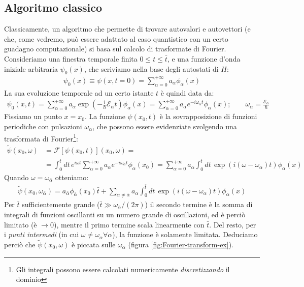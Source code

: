 \documentclass[../../InformazioneQuantistica.tex]{subfiles}
\begin{document}
\subsection{Algoritmo classico}
Classicamente, un algoritmo che permette di trovare autovalori e autovettori (e che, come vedremo, può essere adattato al caso quantistico con un certo guadagno computazionale) si basa sul calcolo di trasformate di Fourier.\\
Consideriamo una finestra temporale finita $0\leq t \leq \bar{t}$, e una funzione d'onda iniziale arbitraria $\psi_0(x)$, che scriviamo nella base degli autostati di $H$:
\begin{align*}
    \psi_0(x) \equiv \psi(x,t=0) = \sum_{\alpha=0}^{+\infty} a_\alpha \phi_\alpha(x)
\end{align*}
La sua evoluzione temporale ad un certo istante $t$ è quindi data da:
\begin{align*}
    \psi_0(x,t) = \sum_{\alpha=0}^{+\infty} a_\alpha \exp\left( - \frac{i}{\hbar} \mathcal{E}_\alpha t \right) \phi_\alpha(x) = \sum_{\alpha=0}^{+\infty} a_\alpha e^{-i\omega_\alpha t} \phi_\alpha(x); \qquad \omega_\alpha = \frac{\mathcal{E}_\alpha}{\hbar}
\end{align*}
Fissiamo un punto $x=x_0$. La funzione $\psi(x_0,t)$ è la sovrapposizione di funzioni periodiche con pulsazioni $\omega_\alpha$, che possono essere evidenziate svolgendo una trasformata di Fourier\footnote{Gli integrali possono essere calcolati numericamente \textit{discretizzando} il dominio}:
\begin{align*}
    \tilde{\psi}(x_0, \omega) &= \mathcal{F}[\psi(x_0,t)](x_0, \omega) =\\
    &= \int_0^{\bar{t}} dt\, e^{i\omega t} \sum_{\alpha=0}^{+\infty} a_\alpha e^{-i\omega_\alpha t}\phi_\alpha(x_0) = 
    \sum_{\alpha=0}^{+\infty} a_\alpha \int_0^{\bar{t}} dt\, \exp(i(\omega-\omega_\alpha)t) \phi_\alpha(x)
\end{align*}
Quando $\omega = \omega_{\bar{\alpha}}$ otteniamo:
\begin{align*}
    \tilde{\psi}(x_0, \omega_{\bar{\alpha}}) = a_{\bar{\alpha}} \phi_{\bar{\alpha}}(x_0) \bar{t} + \sum_{\alpha \neq \bar{\alpha}} a_\alpha \int_0^{\bar{t}} dt\, \exp(i(\omega-\omega_\alpha)t)\phi_\alpha(x)
\end{align*}
Per $\bar{t}$ sufficientemente grande ($\bar{t} \gg \omega_{\bar{\alpha}}/(2\pi)$) il secondo termine è la somma di integrali di funzioni oscillanti su un numero grande di oscillazioni, ed è perciò limitato (è $\to 0$), mentre il primo termine scala linearmente con $\bar{t}$. Del resto, per i \textit{punti intermedi} (in cui $\omega \neq \omega_\alpha \forall \alpha$), la funzione è solamente limitata. Deduciamo perciò che $\tilde{\psi}(x_0, \omega)$ è piccata sulle $\omega_\alpha$ (figura \ref{fig:Fourier-transform-ex}).\\
\end{document}
